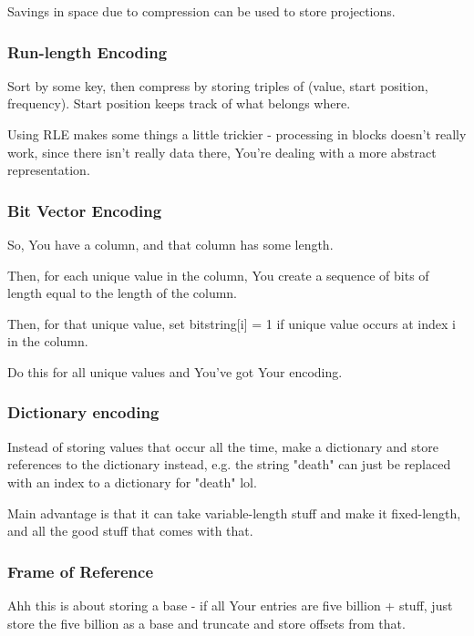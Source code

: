 \documentclass{article}
\begin{document}
			Savings in space due to compression can be used to store projections.
			
		\subsubsection{Run-length Encoding}
		
			Sort by some key, then compress by storing triples of (value, start position, frequency). Start position keeps track of what belongs where.
			
			Using RLE makes some things a little trickier - processing in blocks doesn't really work, since there isn't really data there, You're dealing with a more abstract representation.
			
		\subsubsection{Bit Vector Encoding}
		
			So, You have a column, and that column has some length.
			
			Then, for each unique value in the column, You create a sequence of bits of length equal to the length of the column.
			
			Then, for that unique value, set bitstring[i] = 1 if unique value occurs at index i in the column.
			
			Do this for all unique values and You've got Your encoding.
			
		\subsubsection{Dictionary encoding}
			
			Instead of storing values that occur all the time, make a dictionary and store references to the dictionary instead, e.g. the string "death" can just be replaced with an index to a dictionary for "death" lol.
			
			Main advantage is that it can take variable-length stuff and make it fixed-length, and all the good stuff that comes with that.
			
		\subsubsection{Frame of Reference}
			
			Ahh this is about storing a base - if all Your entries are five billion + stuff, just store  the five billion as a base and truncate and store offsets from that.
			
\end{document}
